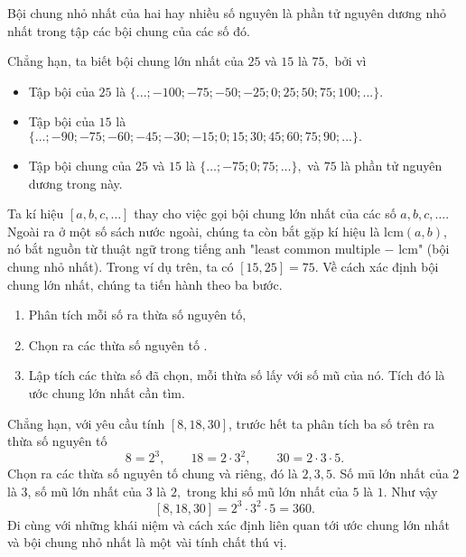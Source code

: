 \begin{dx}
Bội chung nhỏ nhất của hai hay nhiều số nguyên là phần tử nguyên dương nhỏ nhất trong tập các bội chung của các số đó.
\end{dx} 
Chẳng hạn, ta biết bội chung lớn nhất của $25$ và $15$ là $75,$ bởi vì
    \begin{itemize}
        \item Tập bội của $25$ là $\{...;-100;-75;-50;-25;0;25;50;75;100;...\}.$
        \item Tập bội của $15$ là $\{...;-90;-75;-60;-45;-30;-15;0;15;30;45;60;75;90;...\}.$   
        \item Tập bội chung của $25$ và $15$ là $\{\ldots;-75;0;75;\ldots\},$ và $75$ là phần tử nguyên dương trong này.
    \end{itemize}
Ta kí hiệu $[a,b,c,\ldots]$ thay cho việc gọi bội chung lớn nhất của các số $a,b,c,\ldots.$ Ngoài ra ở một số sách nước ngoài, chúng ta còn bắt gặp kí hiệu là $\text{lcm} (a,b)$, nó bắt nguồn từ thuật ngữ trong tiếng anh "least common multiple $-$ lcm" (bội chung nhỏ nhất). Trong ví dụ trên, ta có $[15,25]=75.$ Về cách xác định bội chung lớn nhất, chúng ta tiến hành theo ba bước.
\begin{light}
\begin{enumerate}
    \item Phân tích mỗi số ra thừa số nguyên tố,
    \item Chọn ra các thừa số nguyên tố .
    \item Lập tích các thừa số đã chọn, mỗi thừa số lấy với số mũ  của nó. Tích đó là ước chung lớn nhất cần tìm.
\end{enumerate}
\end{light}
Chẳng hạn, với yêu cầu tính $[8,18,30]$, trước hết ta phân tích ba số trên ra thừa số nguyên tố
$$8 =2^{3},\qquad18 =2 \cdot 3^{2},\qquad30 =2 \cdot 3 \cdot 5.$$
Chọn ra các thừa số nguyên tố chung và riêng, đó là $2,3,5$. Số mū lớn nhất của $2$ là $3$, số mũ lớn nhất của $3$ là $2,$ trong khi số mũ lớn nhất của $5$ là $1.$ Như vậy
$$[8,18,30]=2^{3} \cdot 3^{2} \cdot 5=360.$$
Đi cùng với những khái niệm và cách xác định liên quan tới ước chung lớn nhất và bội chung nhỏ nhất là một vài tính chất thú vị.

